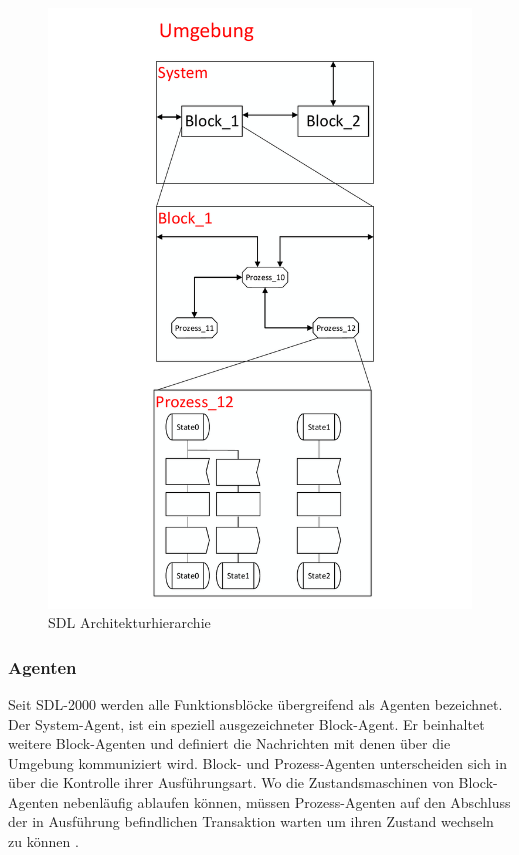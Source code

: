 \begin{figure}[h]
	\centering
	\includegraphics[width=1\textwidth]{Graphics/Agenten.pdf}
	\caption{SDL Architekturhierarchie}
	\label{fig:Agenten}
\end{figure}

\subsubsection{Agenten}
Seit \ac{SDL}-2000 werden alle Funktionsblöcke übergreifend als Agenten bezeichnet. Der System-Agent, ist ein speziell ausgezeichneter Block-Agent. Er beinhaltet weitere Block-Agenten und definiert die Nachrichten mit denen über die Umgebung kommuniziert wird. Block- und Prozess-Agenten unterscheiden sich in über die Kontrolle ihrer Ausführungsart. Wo die Zustandsmaschinen von Block-Agenten nebenläufig ablaufen können, müssen Prozess-Agenten auf den Abschluss der in Ausführung befindlichen Transaktion warten um ihren Zustand wechseln zu können \cite[29\psq]{ITUT101_2016}.


